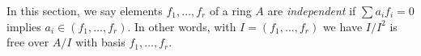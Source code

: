 \noindent
In this section, we say elements $f_1, \ldots, f_r$ of a ring $A$
are {\it independent} if $\sum a_if_i = 0$ implies
$a_i \in (f_1, \ldots, f_r)$. In other words, with $I = (f_1, \ldots, f_r)$
we have $I/I^2$ is free over $A/I$ with basis $f_1, \ldots, f_r$.
